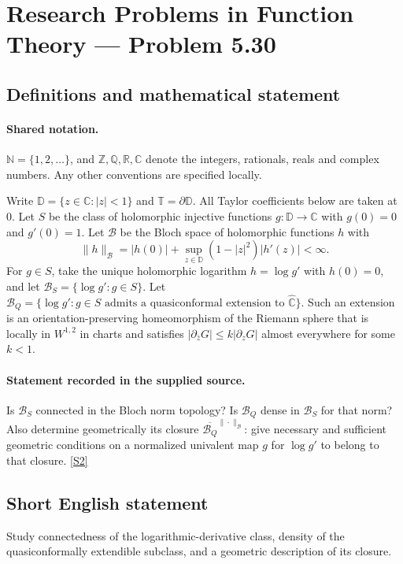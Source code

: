 \documentclass[11pt]{article}
\newcommand{\sref}[2]{\hyperlink{source:#1:#2}{[S#2]}}
\begin{document}
\section{Research Problems in Function Theory — Problem 5.30}\label{statement}

\subsection{Definitions and mathematical statement}

\paragraph{Shared notation.}$\mathbb N=\{1,2,\ldots\}$, and $\mathbb Z,\mathbb Q,\mathbb R,\mathbb C$ denote the integers, rationals, reals and complex numbers. Any other conventions are specified locally.


Write $\mathbb D=\{z\in\mathbb C:|z|<1\}$ and $\mathbb T=\partial\mathbb D$. All Taylor coefficients below are taken at $0$. Let $S$ be the class of holomorphic injective functions $g:\mathbb D\to\mathbb C$ with $g(0)=0$ and $g'(0)=1$. Let $\mathcal B$ be the Bloch space of holomorphic functions $h$ with
\[\|h\|_{\mathcal B}=|h(0)|+\sup_{z\in\mathbb D}(1-|z|^2)|h'(z)|<\infty.
\]
For $g\in S$, take the unique holomorphic logarithm $h=\log g'$ with $h(0)=0$, and let $\mathcal B_S=\{\log g':g\in S\}$. Let $\mathcal B_Q=\{\log g':g\in S\text{ admits a quasiconformal extension to }\widehat{\mathbb C}\}$. Such an extension is an orientation-preserving homeomorphism of the Riemann sphere that is locally in $W^{1,2}$ in charts and satisfies $|\partial_{\bar z}G|\le k|\partial_zG|$ almost everywhere for some $k<1$.
\paragraph{Statement recorded in the supplied source.}
Is $\mathcal B_S$ connected in the Bloch norm topology? Is $\mathcal B_Q$ dense in $\mathcal B_S$ for that norm? Also determine geometrically its closure $\overline{\mathcal B_Q}^{\|\cdot\|_{\mathcal B}}$: give necessary and sufficient geometric conditions on a normalized univalent map $g$ for $\log g'$ to belong to that closure. \sref{statement}{2}
\subsection{Short English statement}
Study connectedness of the logarithmic-derivative class, density of the quasiconformally extendible subclass, and a geometric description of its closure.
\end{document}
